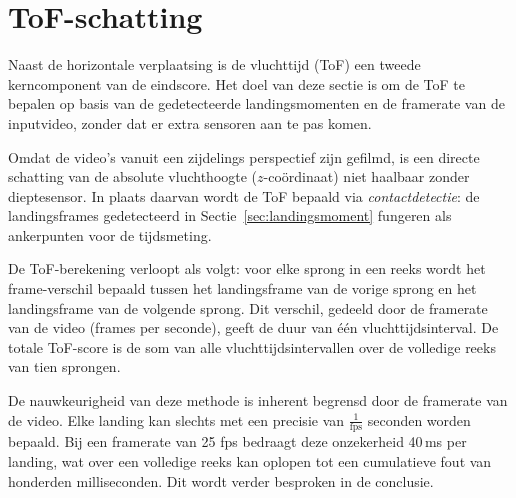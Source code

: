 
\section{ToF-schatting}
\label{sec:tof}

Naast de horizontale verplaatsing is de vluchttijd (ToF) een tweede kerncomponent van de eindscore. Het doel van deze sectie is om de ToF te bepalen op basis van de gedetecteerde landingsmomenten en de framerate van de inputvideo, zonder dat er extra sensoren aan te pas komen.

Omdat de video's vanuit een zijdelings perspectief zijn gefilmd, is een directe schatting van de absolute vluchthoogte ($z$-co{\"o}rdinaat) niet haalbaar zonder dieptesensor. In plaats daarvan wordt de ToF bepaald via \textit{contactdetectie}: de landingsframes gedetecteerd in Sectie~\ref{sec:landingsmoment} fungeren als ankerpunten voor de tijdsmeting.

De ToF-berekening verloopt als volgt: voor elke sprong in een reeks wordt het frame-verschil bepaald tussen het landingsframe van de vorige sprong en het landingsframe van de volgende sprong. Dit verschil, gedeeld door de framerate van de video (frames per seconde), geeft de duur van één vluchttijdsinterval. De totale ToF-score is de som van alle vluchttijdsintervallen over de volledige reeks van tien sprongen.

De nauwkeurigheid van deze methode is inherent begrensd door de framerate van de video. Elke landing kan slechts met een precisie van $\tfrac{1}{\text{fps}}$ seconden worden bepaald. Bij een framerate van 25 fps bedraagt deze onzekerheid 40\,ms per landing, wat over een volledige reeks kan oplopen tot een cumulatieve fout van honderden milliseconden. Dit wordt verder besproken in de conclusie.
